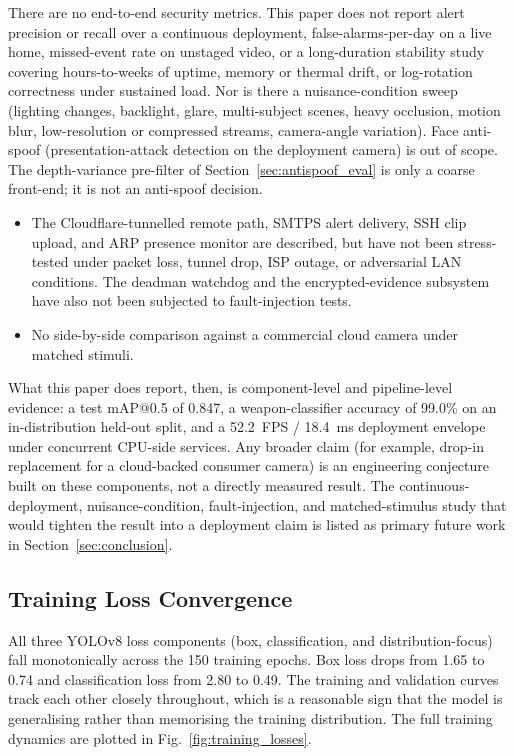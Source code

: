 \documentclass{ieeeaccess}
\begin{document}
There are no end-to-end security metrics. This paper does not report alert precision or recall over a continuous deployment, false-alarms-per-day on a live home, missed-event rate on unstaged video, or a long-duration stability study covering hours-to-weeks of uptime, memory or thermal drift, or log-rotation correctness under sustained load. Nor is there a nuisance-condition sweep (lighting changes, backlight, glare, multi-subject scenes, heavy occlusion, motion blur, low-resolution or compressed streams, camera-angle variation). Face anti-spoof (presentation-attack detection on the deployment camera) is out of scope. The depth-variance pre-filter of Section~\ref{sec:antispoof_eval} is only a coarse front-end; it is not an anti-spoof decision.
\begin{itemize}
\item The Cloudflare-tunnelled remote path, SMTPS alert delivery, SSH clip upload, and ARP presence monitor are described, but have not been stress-tested under packet loss, tunnel drop, ISP outage, or adversarial LAN conditions. The deadman watchdog and the encrypted-evidence subsystem have also not been subjected to fault-injection tests.
\item No side-by-side comparison against a commercial cloud camera under matched stimuli.
\end{itemize}
What this paper does report, then, is component-level and pipeline-level evidence: a test mAP{@}0.5 of 0.847, a weapon-classifier accuracy of 99.0\% on an in-distribution held-out split, and a 52.2~FPS / 18.4~ms deployment envelope under concurrent CPU-side services. Any broader claim (for example, drop-in replacement for a cloud-backed consumer camera) is an engineering conjecture built on these components, not a directly measured result. The continuous-deployment, nuisance-condition, fault-injection, and matched-stimulus study that would tighten the result into a deployment claim is listed as primary future work in Section~\ref{sec:conclusion}.

\subsection{Training Loss Convergence}
All three YOLOv8 loss components (box, classification, and distribution-focus) fall monotonically across the 150 training epochs. Box loss drops from 1.65 to 0.74 and classification loss from 2.80 to 0.49. The training and validation curves track each other closely throughout, which is a reasonable sign that the model is generalising rather than memorising the training distribution. The full training dynamics are plotted in Fig.~\ref{fig:training_losses}.
\end{document}
